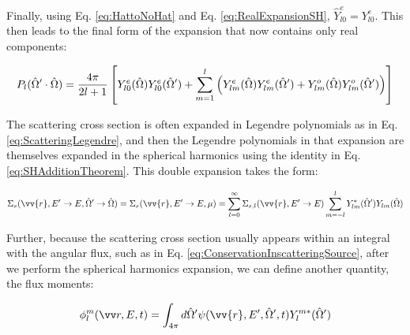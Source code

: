 Finally, using Eq. \eqref{eq:HattoNoHat} and Eq. \eqref{eq:RealExpansionSH}, \(\hat{Y}_{l0}^e=Y_{l0}^e\). This then leads to the final form of the expansion that now contains only real components:

\begin{equation}
\begin{aligned}
\label{eq:FullExpansion5}
P_l(\hat{\Omega}  '\cdot\hat{\Omega}  )=\frac{4\pi}{2l+1}\left\lbrack Y_{l0}^e(\hat{\Omega}  )Y_{l0}^e(\hat{\Omega}  ')+\sum_{m=1}^{l}\left(Y_{lm}^e(\hat{\Omega}  )Y_{lm}^{e}(\hat{\Omega}  ')+Y_{lm}^o(\hat{\Omega}  )Y_{lm}^{o}(\hat{\Omega}  ')\right)\right\rbrack\\
\end{aligned}
\end{equation}





The scattering cross section is often expanded in Legendre polynomials as in Eq. \ref{eq:ScatteringLegendre}, and then the Legendre polynomials in that expansion are themselves expanded in the spherical harmonics using the identity in Eq. \ref{eq:SHAdditionTheorem}. This double expansion takes the form:

\begin{equation}
\label{eq:ScatteringLegendreandSH}
\Sigma_s(\vv{r}, E'\rightarrow E, \hO  '\rightarrow\hO  ) = \Sigma_s(\vv{r}, E'\rightarrow E, \mu) = \sum_{l=0}^{\infty} \Sigma_{s,l}(\vv{r}, E'\rightarrow E) \sum_{m=-l}^{l} Y_{lm}^{*} (\hO  ') Y_{lm}(\hO  )
\end{equation}

Further, because the scattering cross section usually appears within an integral with the angular flux, such as in Eq. \ref{eq:ConservationInscatteringSource}, after we perform the spherical harmonics expansion, we can define another quantity, the flux moments:

\begin{equation}
\label{eq:FluxMomentSH}
\phi_l^m\spas = \int_{4\pi}^{} d\hO  '\psi(\vv{r}, E', \hO  ', t)Y_l^{m*}(\hO  ')
\end{equation}
